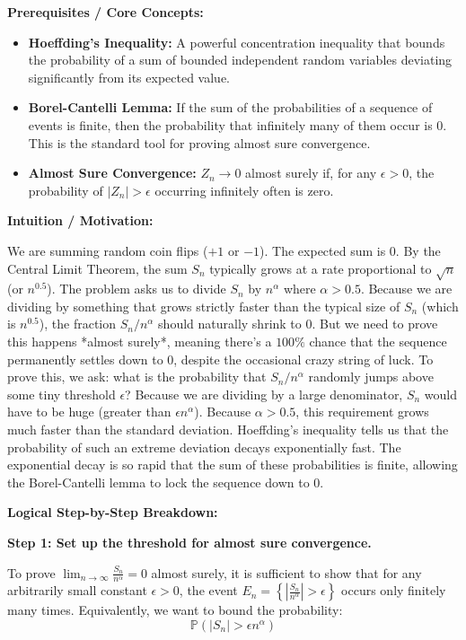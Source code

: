 \begin{solution}
\textbf{Prerequisites / Core Concepts:}
\begin{itemize}
    \item \textbf{Hoeffding's Inequality:} A powerful concentration inequality that bounds the probability of a sum of bounded independent random variables deviating significantly from its expected value.
    \item \textbf{Borel-Cantelli Lemma:} If the sum of the probabilities of a sequence of events is finite, then the probability that infinitely many of them occur is 0. This is the standard tool for proving almost sure convergence.
    \item \textbf{Almost Sure Convergence:} $Z_n \to 0$ almost surely if, for any $\epsilon > 0$, the probability of $|Z_n| > \epsilon$ occurring infinitely often is zero.
\end{itemize}

\textbf{Intuition / Motivation:}

We are summing random coin flips ($+1$ or $-1$). The expected sum is 0. By the Central Limit Theorem, the sum $S_n$ typically grows at a rate proportional to $\sqrt{n}$ (or $n^{0.5}$).
The problem asks us to divide $S_n$ by $n^\alpha$ where $\alpha > 0.5$. Because we are dividing by something that grows strictly faster than the typical size of $S_n$ (which is $n^{0.5}$), the fraction $S_n / n^\alpha$ should naturally shrink to 0.
But we need to prove this happens *almost surely*, meaning there's a $100\%$ chance that the sequence permanently settles down to 0, despite the occasional crazy string of luck.
To prove this, we ask: what is the probability that $S_n / n^\alpha$ randomly jumps above some tiny threshold $\epsilon$? Because we are dividing by a large denominator, $S_n$ would have to be huge (greater than $\epsilon n^\alpha$). Because $\alpha > 0.5$, this requirement grows much faster than the standard deviation. Hoeffding's inequality tells us that the probability of such an extreme deviation decays exponentially fast. The exponential decay is so rapid that the sum of these probabilities is finite, allowing the Borel-Cantelli lemma to lock the sequence down to 0.

\textbf{Logical Step-by-Step Breakdown:}

\textbf{Step 1: Set up the threshold for almost sure convergence.}

To prove $\lim_{n \to \infty} \frac{S_n}{n^\alpha} = 0$ almost surely, it is sufficient to show that for any arbitrarily small constant $\epsilon > 0$, the event $E_n = \left\{ \left| \frac{S_n}{n^\alpha} \right| > \epsilon \right\}$ occurs only finitely many times.
Equivalently, we want to bound the probability:
\[ \mathbb{P}(|S_n| > \epsilon n^\alpha) \]


\end{solution}
